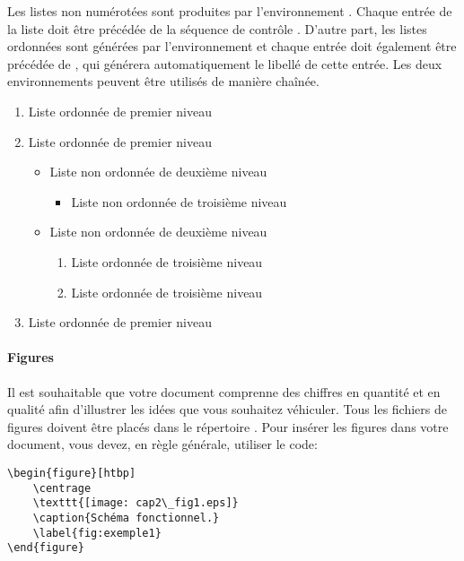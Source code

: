 Les listes non numérotées sont produites par l'environnement . Chaque entrée de la liste doit être précédée de la séquence de contrôle . D'autre part, les listes ordonnées sont générées par l'environnement  et chaque entrée doit également être précédée de , qui générera automatiquement le libellé de cette entrée. Les deux environnements peuvent être utilisés de manière chaînée.

\clearpage
\begin{enumerate}
    \item Liste ordonnée de premier niveau
    \item Liste ordonnée de premier niveau
    \begin{itemize}
      \item Liste non ordonnée de deuxième niveau
      \begin{itemize}
        \item Liste non ordonnée de troisième niveau
      \end{itemize}
      \item Liste non ordonnée de deuxième niveau
      \begin{enumerate}
        \item Liste ordonnée de troisième niveau
        \item Liste ordonnée de troisième niveau
      \end{enumerate}
    \end{itemize}
    \item Liste ordonnée de premier niveau
\end{enumerate}


\paragraph{Figures}

Il est souhaitable que votre document comprenne des chiffres en quantité et en qualité afin d'illustrer les idées que vous souhaitez véhiculer. Tous les fichiers de figures doivent être placés dans le répertoire . Pour insérer les figures dans votre document, vous devez, en règle générale, utiliser le code:
\begin{verbatim}
\begin{figure}[htbp]
    \centrage
    \texttt{[image: cap2\_fig1.eps]}
    \caption{Schéma fonctionnel.}
    \label{fig:exemple1}
\end{figure}
\end{verbatim}

